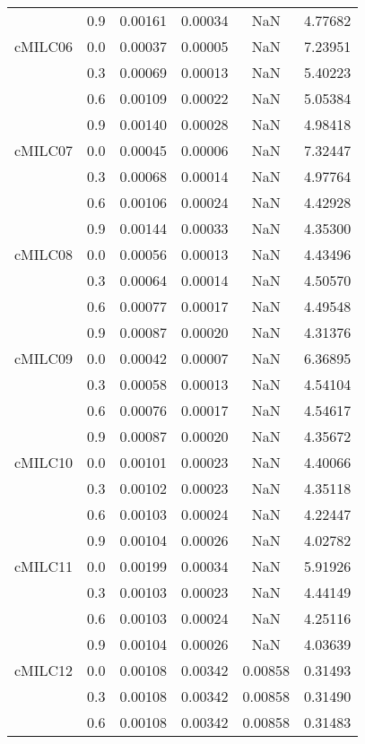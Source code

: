 \begin{longtable}{cccccc}
        & 0.9 & 0.00161 & 0.00034 & NaN & 4.77682 \\
cMILC06 & 0.0 & 0.00037 & 0.00005 & NaN & 7.23951 \\
        & 0.3 & 0.00069 & 0.00013 & NaN & 5.40223 \\
        & 0.6 & 0.00109 & 0.00022 & NaN & 5.05384 \\
        & 0.9 & 0.00140 & 0.00028 & NaN & 4.98418 \\
cMILC07 & 0.0 & 0.00045 & 0.00006 & NaN & 7.32447 \\
        & 0.3 & 0.00068 & 0.00014 & NaN & 4.97764 \\
        & 0.6 & 0.00106 & 0.00024 & NaN & 4.42928 \\
        & 0.9 & 0.00144 & 0.00033 & NaN & 4.35300 \\
cMILC08 & 0.0 & 0.00056 & 0.00013 & NaN & 4.43496 \\
        & 0.3 & 0.00064 & 0.00014 & NaN & 4.50570 \\
        & 0.6 & 0.00077 & 0.00017 & NaN & 4.49548 \\
        & 0.9 & 0.00087 & 0.00020 & NaN & 4.31376 \\
cMILC09 & 0.0 & 0.00042 & 0.00007 & NaN & 6.36895 \\
        & 0.3 & 0.00058 & 0.00013 & NaN & 4.54104 \\
        & 0.6 & 0.00076 & 0.00017 & NaN & 4.54617 \\
        & 0.9 & 0.00087 & 0.00020 & NaN & 4.35672 \\
cMILC10 & 0.0 & 0.00101 & 0.00023 & NaN & 4.40066 \\
        & 0.3 & 0.00102 & 0.00023 & NaN & 4.35118 \\
        & 0.6 & 0.00103 & 0.00024 & NaN & 4.22447 \\
        & 0.9 & 0.00104 & 0.00026 & NaN & 4.02782 \\
cMILC11 & 0.0 & 0.00199 & 0.00034 & NaN & 5.91926 \\
        & 0.3 & 0.00103 & 0.00023 & NaN & 4.44149 \\
        & 0.6 & 0.00103 & 0.00024 & NaN & 4.25116 \\
        & 0.9 & 0.00104 & 0.00026 & NaN & 4.03639 \\
cMILC12 & 0.0 & 0.00108 & 0.00342 & 0.00858 & 0.31493 \\
        & 0.3 & 0.00108 & 0.00342 & 0.00858 & 0.31490 \\
        & 0.6 & 0.00108 & 0.00342 & 0.00858 & 0.31483 \\

\end{longtable}
